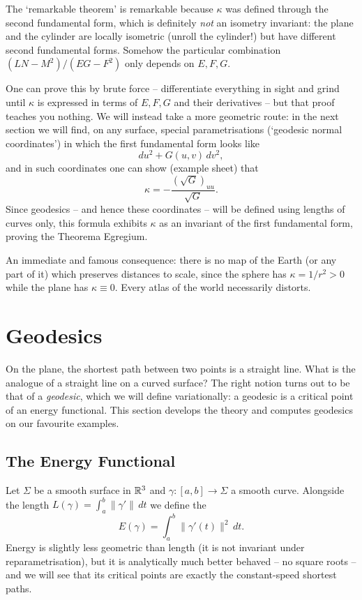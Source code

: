 \documentclass[a4paper]{scrartcl}
\begin{document}
The `remarkable theorem' is remarkable because $\kappa$ was defined through the second fundamental form, which is definitely \emph{not} an isometry invariant: the plane and the cylinder are locally isometric (unroll the cylinder!) but have different second fundamental forms. Somehow the particular combination $(LN - M^2)/(EG - F^2)$ only depends on $E, F, G$.

One can prove this by brute force -- differentiate everything in sight and grind until $\kappa$ is expressed in terms of $E, F, G$ and their derivatives -- but that proof teaches you nothing. We will instead take a more geometric route: in the next section we will find, on any surface, special parametrisations (`geodesic normal coordinates') in which the first fundamental form looks like
$$
du^2 + G(u,v)\,dv^2,
$$
and in such coordinates one can show (example sheet) that
$$
\kappa = -\frac{(\sqrt{G})_{uu}}{\sqrt{G}}.
$$
Since geodesics -- and hence these coordinates -- will be defined using lengths of curves only, this formula exhibits $\kappa$ as an invariant of the first fundamental form, proving the Theorema Egregium.

An immediate and famous consequence: there is no map of the Earth (or any part of it) which preserves distances to scale, since the sphere has $\kappa = 1/r^2 > 0$ while the plane has $\kappa \equiv 0$. Every atlas of the world necessarily distorts.

\section{Geodesics}

On the plane, the shortest path between two points is a straight line. What is the analogue of a straight line on a curved surface? The right notion turns out to be that of a \emph{geodesic}, which we will define variationally: a geodesic is a critical point of an energy functional. This section develops the theory and computes geodesics on our favourite examples.

\subsection{The Energy Functional}

Let $\Sigma$ be a smooth surface in $\mathbb{R}^3$ and $\gamma: [a, b] \rightarrow \Sigma$ a smooth curve. Alongside the length $L(\gamma) = \int_a^b \|\gamma'\|\,dt$ we define the 
$$
E(\gamma) = \int_a^b \|\gamma'(t)\|^2 \, dt.
$$
Energy is slightly less geometric than length (it is not invariant under reparametrisation), but it is analytically much better behaved -- no square roots -- and we will see that its critical points are exactly the constant-speed shortest paths.
\end{document}
